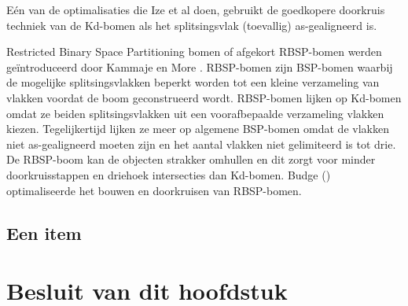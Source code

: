 Eén van de optimalisaties die Ize et al doen, gebruikt de goedkopere doorkruis techniek van de Kd-bomen als het splitsingsvlak (toevallig) as-gealigneerd is. 

Restricted Binary Space Partitioning bomen of afgekort RBSP-bomen werden geïntroduceerd door Kammaje en More \cite{Kammaje}.
RBSP-bomen zijn BSP-bomen waarbij de mogelijke splitsingsvlakken beperkt worden tot een kleine verzameling van vlakken voordat de boom geconstrueerd wordt. 
RBSP-bomen lijken op Kd-bomen omdat ze beiden splitsingsvlakken uit een voorafbepaalde verzameling vlakken kiezen.
Tegelijkertijd lijken ze meer op algemene BSP-bomen omdat de vlakken niet as-gealigneerd moeten zijn en het aantal vlakken niet gelimiteerd is tot drie.
De RBSP-boom kan de objecten strakker omhullen en dit zorgt voor minder doorkruisstappen en driehoek intersecties dan Kd-bomen. 
Budge (\cite{Budge}) optimaliseerde het bouwen en doorkruisen van RBSP-bomen.

\subsection{Een item}

\section{Besluit van dit hoofdstuk}
